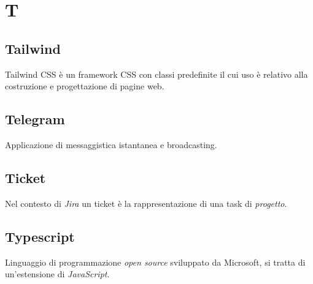 \chapter{T}

\section{Tailwind}
Tailwind CSS è un framework CSS con classi predefinite il cui uso è relativo alla costruzione e progettazione di pagine web.

\section{Telegram}
Applicazione di messaggistica istantanea e broadcasting.
\section{Ticket}\label{sec:Tickets}
Nel contesto di \emph{Jira} un ticket è la rappresentazione di una task di \emph{progetto}.
\section{Typescript}
Linguaggio di programmazione \emph{open source} sviluppato da Microsoft, si tratta di un'estensione di \emph{JavaScript}. 
